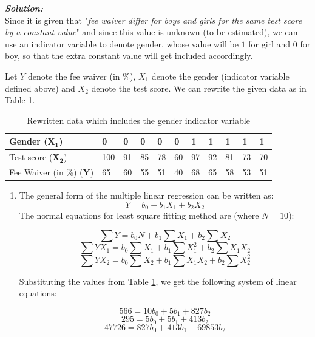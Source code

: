 \documentclass[12pt, oneside]{article}
\begin{document}
\begin{enumerate}
\begin{enumerate}
\end{enumerate}



\textit{\textbf{Solution:}} \\
Since it is given that "\textit{fee waiver differ for boys and girls for the same test score by a \textit{constant} value}"
and since this value is unknown (to be estimated), we can use an indicator variable  to denote gender, whose value will be $1$ for girl and $0$ for boy, so that the extra constant value will get included accordingly.

Let $Y$ denote the fee waiver (in \%), $X_1$ denote the gender (indicator variable defined above) and $X_2$ denote the test score. We can rewrite the given data as in Table \ref{tab:q5_upd_data_1}.

\begin{table}[h]
    \centering
    \begin{tabular}{l|llllllllll}
         Gender ($\mathbf{X_1}$) & 0 & 0 & 0 & 0 & 0 & 1 & 1 & 1 & 1 & 1 \\ \hline
         Test score ($\mathbf{X_2}$)  & 100 & 91 & 85 & 78 & 60 & 97 & 92 & 81 & 73 & 70 \\ \hline
         Fee Waiver (in \%) ($\mathbf{Y}$)&  65& 60& 55& 51& 40  & 68& 65&  58&  53& 51\\
    \end{tabular}
    \caption{Rewritten data which includes the gender indicator variable}
    \label{tab:q5_upd_data_1}
\end{table}

\begin{enumerate}
\item 
The general form of the multiple linear regression can be written as:
\[ Y = b_0 + b_1X_1 + b_2X_2 \]
The normal equations for least square fitting method are (where $N=10$):


\[ \sum Y = b_0N + b_1 \sum X_1 + b_2\sum X_2 \]
\[ \sum YX_1 = b_0 \sum X_1 + b_1 \sum X_1^2 + b_2 \sum X_1X_2 \]
\[ \sum YX_2 = b_0 \sum X_2 + b_1 \sum X_1X_2 + b_2 \sum X_2^2 \]

Substituting the values from Table \ref{tab:q5_upd_data_1}, we get the following system of linear equations:

\[ 566 = 10 b_0 + 5 b_1  + 827 b_2 \]
\[ 295 = 5 b_0 + 5 b_1 + 413 b_2  \]
\[ 47726 = 827 b_0 + 413 b_1 + 69853 b_2 \]


\end{enumerate}
\end{enumerate}
\end{document}
